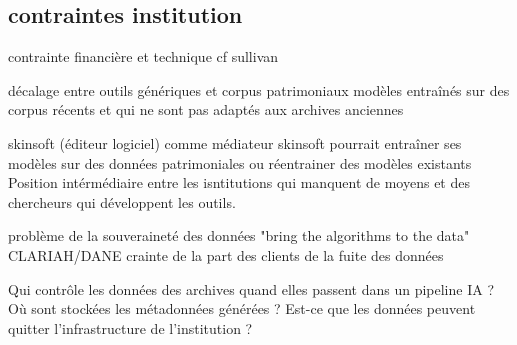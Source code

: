 \subsection{contraintes institution}

\item contrainte financière et technique 
cf sullivan

\item décalage entre outils génériques et corpus patrimoniaux 
modèles entraînés sur des corpus récents et qui ne sont pas adaptés aux archives anciennes 

\item skinsoft (éditeur logiciel) comme médiateur 
skinsoft pourrait entraîner ses modèles sur des données patrimoniales ou réentrainer des modèles existants 
Position intérmédiaire entre les isntitutions qui manquent de moyens et des chercheurs qui développent les outils. 

\item problème de la souveraineté des données 
"bring the algorithms to the data" CLARIAH/DANE
crainte de la part des clients de la fuite des données

Qui contrôle les données des archives quand elles passent dans un pipeline IA ? Où sont stockées les métadonnées générées ? Est-ce que les données peuvent quitter l'infrastructure de l'institution ?
